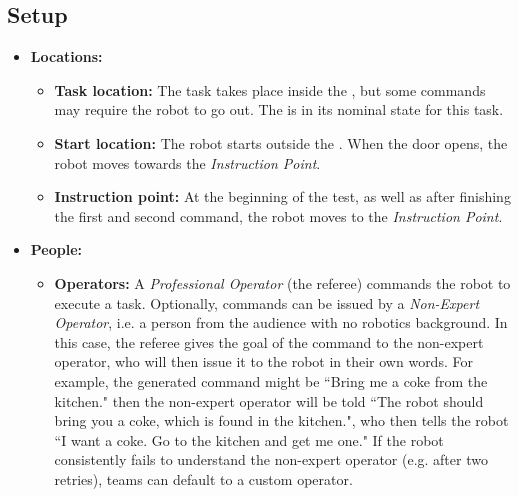 \subsection*{Setup}
\begin{itemize}[nosep]
    \item \textbf{Locations:}
        \begin{itemize}
            \item \textbf{Task location:} The task takes place inside the \Arena{}, but some commands may require the robot to go out. The \Arena{} is in its nominal state for this task.
            \item \textbf{Start location:} The robot starts outside the \Arena{}. When the door opens, the robot moves towards the \textit{Instruction Point}.
            \item \textbf{Instruction point:} At the beginning of the test, as well as after finishing the first and second command, the robot moves to the \textit{Instruction Point}.
        \end{itemize}
    \item \textbf{People:}
        \begin{itemize}
            \item \textbf{Operators:} A \emph{Professional Operator} (the referee) commands the robot to execute a task.
            Optionally, commands can be issued by a \emph{Non-Expert Operator}, i.e. a person from the audience with no robotics background.
            In this case, the referee gives the goal of the command to the non-expert operator, who will then issue it to the robot in their own words. For example, the generated command might be ``Bring me a coke from the kitchen." then the non-expert operator will be told ``The robot should bring you a coke, which is found in the kitchen.", who then tells the robot ``I want a coke. Go to the kitchen and get me one."
            If the robot consistently fails to understand the non-expert operator (e.g. after two retries), teams can default to a custom operator.
        \end{itemize}
\end{itemize}


